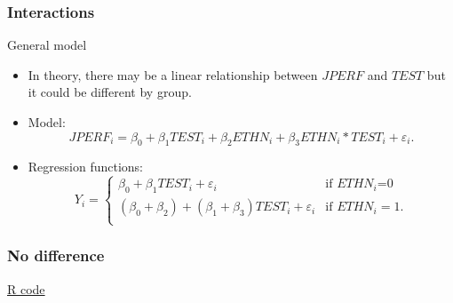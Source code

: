 \documentclass[handout]{beamer}
\begin{document}

   \begin{frame} \frametitle{Interactions}

   \begin{block}
   {General model}

   \begin{itemize}

   \item In theory, there may be a linear relationship
   between $JPERF$ and $TEST$ but it could be different by group.

   \item Model:
   {\small
   $$
   JPERF_i = \beta_0 + \beta_1 TEST_i + \beta_2 ETHN_i + \beta_3 ETHN_i * TEST_i + \varepsilon_i.
   $$
   }
   \item Regression functions:
   {\small
   $$
   Y_i =
   \begin{cases}
   \beta_0 + \beta_1 TEST_i + \varepsilon_i & \text{if $ETHN_i$=0} \\
   (\beta_0 + \beta_2) + (\beta_1 + \beta_3) TEST_i + \varepsilon_i & \text{if $ETHN_i=1$.} \\
   \end{cases}
   $$
   }
   \end{itemize}
   \end{block}
   \end{frame}



   \begin{frame}
   \frametitle{No difference}
   \begin{center}
   \end{center}
   \href{http://stats191.stanford.edu/interactions.html#minority-employment-data}{R code}
   \end{frame}
\end{document}
